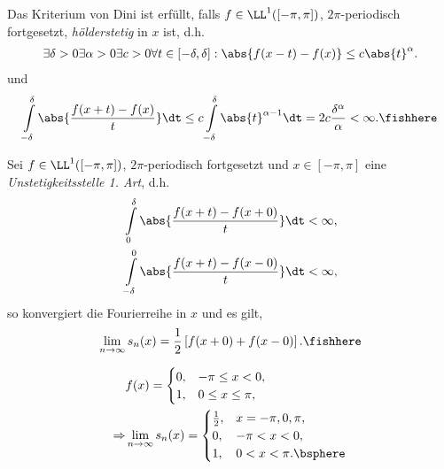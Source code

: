 \begin{prop}
\label{prop:1.54}
Das Kriterium von Dini ist erfüllt, falls $f\in\LL^1([-\pi,\pi])$,
$2\pi$-periodisch fortgesetzt, \emph{hölderstetig} in $x$ ist, d.h.
\begin{align*}
\exists\delta > 0 \exists\alpha > 0 \exists c > 0 \forall t\in[-\delta,\delta]
: \abs{f(x-t)-f(x)} \le c\abs{t}^\alpha.
\end{align*}
und
\begin{align*}
\int\limits_{-\delta}^\delta \abs{\frac{f(x+t)-f(x)}{t}}\dt \le
c\int\limits_{-\delta}^\delta \abs{t}^{\alpha-1}\dt =
2c\frac{\delta^\alpha}{\alpha} <\infty.\fishhere
\end{align*}
\end{prop}

\begin{prop}
\label{prop:1.55}
Sei $f\in\LL^1([-\pi,\pi])$, $2\pi$-periodisch fortgesetzt und $x\in[-\pi,\pi]$
eine \emph{Unstetigkeitsstelle 1. Art}, d.h.
\begin{align*}
&\int\limits_{0}^\delta \abs{\frac{f(x+t)-f(x+0)}{t}} \dt < \infty,\\
&\int\limits_{-\delta}^0 \abs{\frac{f(x+t)-f(x-0)}{t}} \dt < \infty,
\end{align*}
so konvergiert die Fourierreihe in $x$ und es gilt,
\begin{align*}
\lim\limits_{n\to\infty} s_n(x) =
\frac{1}{2}\left[f(x+0)+f(x-0)\right].\fishhere
\end{align*}
\end{prop}
\begin{bspn}
\begin{align*}
&f(x) =
\begin{cases}
0, & -\pi\le x <0,\\
1, & 0\le x\le \pi,
\end{cases}\\
\Rightarrow &
\lim\limits_{n\to\infty} s_n(x)
=
\begin{cases}
\frac{1}{2}, & x = -\pi,0,\pi,\\
0, & -\pi< x <0,\\
1, & 0< x< \pi.\bsphere 
\end{cases}
\end{align*}
\end{bspn}
